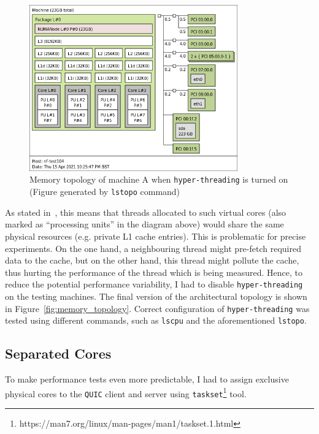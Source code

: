 \documentclass[12pt,a4paper,twoside,openright]{report}
\begin{document}
    \begin{figure}[H]
    \centering
    \includegraphics[width=0.8\textwidth]{figs/topology_with_hyperthreading.png}
    \caption[Memory topology of machine A when \texttt{hyper-threading} is turned on]{Memory topology of machine A when \texttt{hyper-threading} is turned on (Figure generated by \texttt{lstopo} command)}
    \label{fig:topology_with_hyperthreading}
    \end{figure}

As stated in~\cite{hyperthreading_book}, this means that threads allocated to such virtual cores (also marked as \enquote{processing units} in the diagram above) would share the same physical resources (e.g. private L1 cache entries).
This is problematic for precise experiments.
On the one hand, a neighbouring thread might pre-fetch required data to the cache, but on the other hand, this thread might pollute the cache, thus hurting the performance of the thread which is being measured.
Hence, to reduce the potential performance variability, I had to disable \texttt{hyper-threading} on the testing machines.
The final version of the architectural topology is shown in Figure~\ref{fig:memory_topology}. 
Correct configuration of \texttt{hyper-threading} was tested using different commands, such as \texttt{lscpu} and the aforementioned \texttt{lstopo}. 

    
    
\subsection{Separated Cores} \label{SeparatedCores_Subsection_Tag}
To make performance tests even more predictable, I had to assign exclusive physical cores to the \texttt{QUIC} client and server using \texttt{taskset}\footnote{https://man7.org/linux/man-pages/man1/taskset.1.html} tool.
\end{document}
